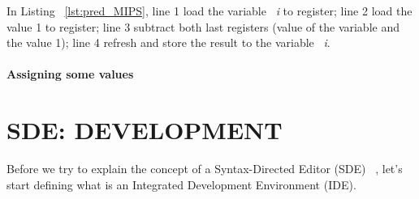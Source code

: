 \documentclass[
  oneside,
  11pt, a4paper,
  footinclude=true,
  headinclude=true,
  cleardoublepage=empty
]{scrbook}
\begin{document}
In Listing ~\ref{lst:pred_MIPS}, line 1 load the variable ~\textit{i} to register; line 2 load the value 1 to register; line 3 subtract both last registers (value of the variable and the value 1); line 4 refresh and store the result to the variable ~\textit{i}.

\subsubsection{Assigning some values}































\chapter{SDE: DEVELOPMENT}

Before we try to explain the concept of a Syntax-Directed Editor (SDE) ~\citep{RT89b,Ko05,alsCH10a,TR81a,RMT86a,RT89a,AHW89}, let's start defining what is an Integrated Development Environment (IDE).
\end{document}
